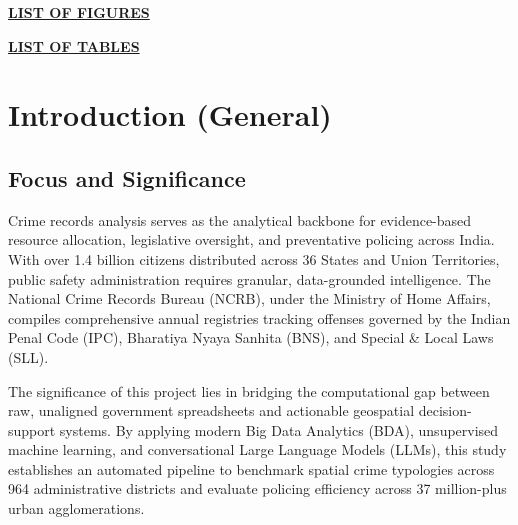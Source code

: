 \documentclass[12pt,a4paper]{report}
\begin{document}
\thispagestyle{frontmatterstyle}
\begin{center}
    {\fontsize{16}{20}\selectfont\bfseries\underline{LIST OF FIGURES}\par}
\end{center}
\vspace{0.3cm}
\listoffigures
\vspace{1cm}
\begin{center}
    {\fontsize{16}{20}\selectfont\bfseries\underline{LIST OF TABLES}\par}
\end{center}
\vspace{0.3cm}
\listoftables
\newpage

\setcounter{page}{1} %

\chapter{Introduction (General)}

\section{Focus and Significance}
Crime records analysis serves as the analytical backbone for evidence-based resource allocation, legislative oversight, and preventative policing across India. With over 1.4 billion citizens distributed across 36 States and Union Territories, public safety administration requires granular, data-grounded intelligence. The National Crime Records Bureau (NCRB), under the Ministry of Home Affairs, compiles comprehensive annual registries tracking offenses governed by the Indian Penal Code (IPC), Bharatiya Nyaya Sanhita (BNS), and Special \& Local Laws (SLL). 

The significance of this project lies in bridging the computational gap between raw, unaligned government spreadsheets and actionable geospatial decision-support systems. By applying modern Big Data Analytics (BDA), unsupervised machine learning, and conversational Large Language Models (LLMs), this study establishes an automated pipeline to benchmark spatial crime typologies across 964 administrative districts and evaluate policing efficiency across 37 million-plus urban agglomerations.
\end{document}
